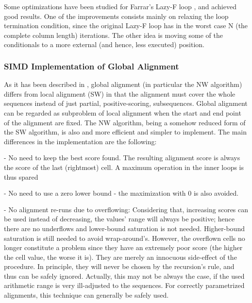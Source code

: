 Some optimizations have been studied for Farrar's Lazy-F loop \cite{swps3} \cite{farrarcell}, and achieved good results. One of the improvements consists mainly on relaxing the loop termination condition, since the original Lazy-F loop has in the worst case N (the complete column length) iterations. The other idea is moving some of the conditionals to a more external (and hence, less executed) position.




\subsubsection{SIMD Implementation of Global Alignment}

As it has been described in , global alignment (in particular the \ac{NW} algorithm) differs from local alignment (\ac{SW}) in that the alignment must cover the whole sequences instead of just partial, positive-scoring, subsequences. Global alignment can be regarded as subproblem of local alignment when the start and end point of the alignment are fixed. The \ac{NW} algorithm, being a somehow reduced form of the \ac{SW} algorithm, is also and more efficient and simpler to implement. The main differences in the implementation are the following:
	
- No need to keep the best score found. The resulting alignment score is always the score of the last (rightmost) cell. A maximum operation in the inner loops is thus spared
	
- No need to use a zero lower bound - the maximization with 0 is also avoided.

- No alignment re-runs due to overflowing: Considering that, increasing scores can be used instead of decreasing, the values' range will always be positive; hence there are no underflows and lower-bound saturation is not needed. Higher-bound saturation is still needed to avoid wrap-around's. However, the overflown cells no longer constitute a problem since they have an extremely poor score (the higher the cell value, the worse it is). They are merely an innocuous side-effect of the procedure. In principle, they will never be chosen by the recursion's rule, and thus can be safely ignored. Actually, this may not be always the case, if the used arithmetic range is very ill-adjusted to the sequences. For correctly parametrized alignments, this technique can generally be safely used.
	
